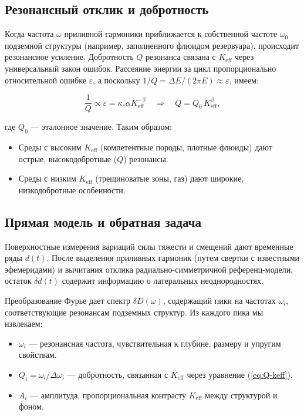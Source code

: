 \documentclass[12pt,a4paper]{article}
\theoremstyle{remark}
\newcommand{\Keff}{K_{\mathrm{eff}}}
\newcommand{\kappac}{\kappa_c}
\newcommand{\eps}{\varepsilon}
\begin{document}
	\subsection{Резонансный отклик и добротность}
	
	Когда частота $\omega$ приливной гармоники приближается к собственной частоте $\omega_0$ подземной структуры (например, заполненного флюидом резервуара), происходит резонансное усиление. Добротность $Q$ резонанса связана с $\Keff$ через универсальный закон ошибок. Рассеяние энергии за цикл пропорционально относительной ошибке $\eps$, а поскольку $1/Q = \Delta E / (2\pi E) \approx \eps$, имеем:
	
	\begin{equation}
		\frac{1}{Q} \propto \eps = \kappac \alpha \Keff^{-\beta} \quad \Longrightarrow \quad Q = Q_0 \, \Keff^{\beta},
		\label{eq:Q-keff}
	\end{equation}
	
	где $Q_0$ — эталонное значение. Таким образом:
	\begin{itemize}
		\item Среды с высоким $\Keff$ (компетентные породы, плотные флюиды) дают острые, высокодобротные ($Q$) резонансы.
		\item Среды с низким $\Keff$ (трещиноватые зоны, газ) дают широкие, низкодобротные особенности.
	\end{itemize}
	
	\subsection{Прямая модель и обратная задача}
	
	Поверхностные измерения вариаций силы тяжести и смещений дают временные ряды $d(t)$. После выделения приливных гармоник (путем свертки с известными эфемеридами) и вычитания отклика радиально-симметричной референц-модели, остаток $\delta d(t)$ содержит информацию о латеральных неоднородностях.
	
	Преобразование Фурье дает спектр $\delta D(\omega)$, содержащий пики на частотах $\omega_i$, соответствующие резонансам подземных структур. Из каждого пика мы извлекаем:
	
	\begin{itemize}
		\item $\omega_i$ — резонансная частота, чувствительная к глубине, размеру и упругим свойствам.
		\item $Q_i = \omega_i / \Delta \omega_i$ — добротность, связанная с $\Keff$ через уравнение (\ref{eq:Q-keff}).
		\item $A_i$ — амплитуда, пропорциональная контрасту $\Keff$ между структурой и фоном.
	\end{itemize}
	
\end{document}
